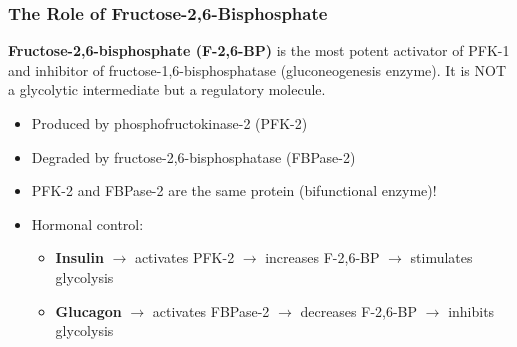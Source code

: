 \subsubsection{The Role of Fructose-2,6-Bisphosphate}

\begin{definition}
\textbf{Fructose-2,6-bisphosphate (F-2,6-BP)} is the most potent activator of PFK-1 and inhibitor of fructose-1,6-bisphosphatase (gluconeogenesis enzyme). It is NOT a glycolytic intermediate but a regulatory molecule.
\end{definition}

\begin{itemize}
    \item Produced by phosphofructokinase-2 (PFK-2)
    \item Degraded by fructose-2,6-bisphosphatase (FBPase-2)
    \item PFK-2 and FBPase-2 are the same protein (bifunctional enzyme)!
    \item Hormonal control:
    \begin{itemize}
        \item \textbf{Insulin} $\rightarrow$ activates PFK-2 $\rightarrow$ increases F-2,6-BP $\rightarrow$ stimulates glycolysis
        \item \textbf{Glucagon} $\rightarrow$ activates FBPase-2 $\rightarrow$ decreases F-2,6-BP $\rightarrow$ inhibits glycolysis
    \end{itemize}
\end{itemize}


